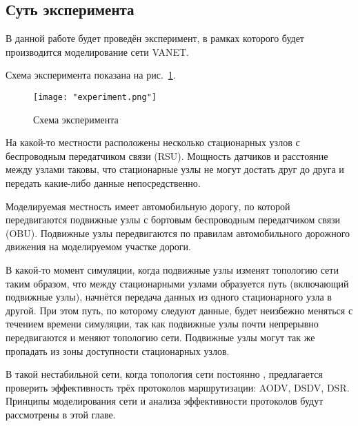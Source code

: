 \subsection{Суть эксперимента}

В данной работе будет проведён эксперимент, в рамках которого будет производится моделирование сети VANET. 

Схема эксперимента показана на рис.~\ref{fig:experiment_scheme}.

\begin{figure}[!h]
    \centering
    \texttt{[image: "experiment.png"]}
    \caption{Схема эксперимента}
    \label{fig:experiment_scheme}
\end{figure}

На какой-то местности расположены несколько стационарных узлов с беспроводным передатчиком связи (RSU). Мощность датчиков и расстояние между узлами таковы, что стационарные узлы не могут достать друг до друга и передать какие-либо данные непосредственно. 

Моделируемая местность имеет автомобильную дорогу, по которой передвигаются подвижные узлы с бортовым беспроводным передатчиком связи (OBU). Подвижные узлы передвигаются по правилам автомобильного дорожного движения на моделируемом участке дороги.

В какой-то момент симуляции, когда подвижные узлы изменят топологию сети таким образом, что между стационарными узлами образуется путь (включающий подвижные узлы), начнётся передача данных из одного стационарного узла в другой. При этом путь, по которому следуют данные, будет неизбежно меняться с течением времени симуляции, так как подвижные узлы почти непрерывно передвигаются и меняют топологию сети. Подвижные узлы могут так же пропадать из зоны доступности стационарных узлов.

В такой нестабильной сети, когда топология сети постоянно , предлагается проверить эффективность трёх протоколов маршрутизации: AODV, DSDV, DSR. Принципы моделирования сети и анализа эффективности протоколов будут рассмотрены в этой главе.